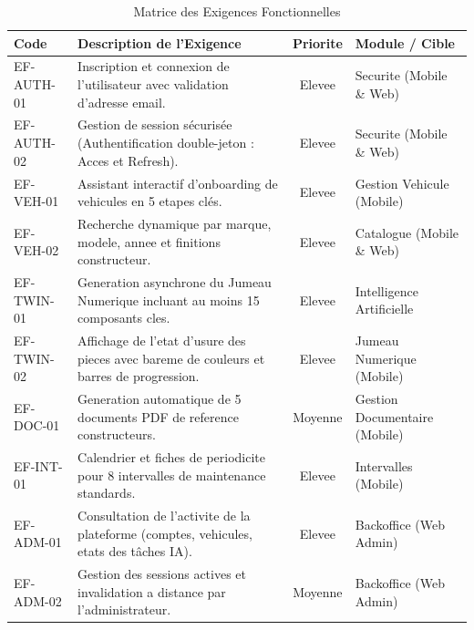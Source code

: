 \documentclass[11pt,a4paper]{report}
\begin{document}
\begin{longtable}{@{}l p{6cm} c p{6cm}@{}}
\caption{Matrice des Exigences Fonctionnelles} \label{tab:exigences_fonc} \\
\toprule
\textbf{Code} & \textbf{Description de l'Exigence} & \textbf{Priorite} & \textbf{Module / Cible} \\ \midrule
\endhead
\toprule
\endfoot
\bottomrule
\endlastfoot
EF-AUTH-01 & Inscription et connexion de l'utilisateur avec validation d'adresse email. & Elevee & Securite (Mobile \& Web) \\
EF-AUTH-02 & Gestion de session sécurisée (Authentification double-jeton : Acces et Refresh). & Elevee & Securite (Mobile \& Web) \\
EF-VEH-01 & Assistant interactif d'onboarding de vehicules en 5 etapes clés. & Elevee & Gestion Vehicule (Mobile) \\
EF-VEH-02 & Recherche dynamique par marque, modele, annee et finitions constructeur. & Elevee & Catalogue (Mobile \& Web) \\
EF-TWIN-01 & Generation asynchrone du Jumeau Numerique incluant au moins 15 composants cles. & Elevee & Intelligence Artificielle \\
EF-TWIN-02 & Affichage de l'etat d'usure des pieces avec bareme de couleurs et barres de progression. & Elevee & Jumeau Numerique (Mobile) \\
EF-DOC-01 & Generation automatique de 5 documents PDF de reference constructeurs. & Moyenne & Gestion Documentaire (Mobile) \\
EF-INT-01 & Calendrier et fiches de periodicite pour 8 intervalles de maintenance standards. & Elevee & Intervalles (Mobile) \\
EF-ADM-01 & Consultation de l'activite de la plateforme (comptes, vehicules, etats des tâches IA). & Elevee & Backoffice (Web Admin) \\
EF-ADM-02 & Gestion des sessions actives et invalidation a distance par l'administrateur. & Moyenne & Backoffice (Web Admin) \\
\end{longtable}
\end{document}
